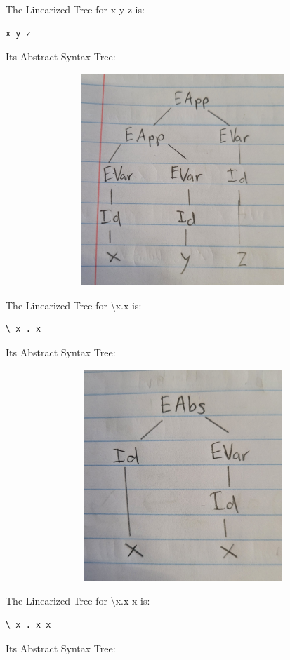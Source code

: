 \documentclass{article}
\theoremstyle{theorem}
\theoremstyle{definition}
\theoremstyle{remark}
\begin{document}
The Linearized Tree for x y z is:
\begin{lstlisting}
x y z
\end{lstlisting}

Its Abstract Syntax Tree:

\includegraphics[width=15cm, height=8cm]{Report Images/week5_4.jpg}

The Linearized Tree for \textbackslash  x.x is:
\begin{lstlisting}
\ x . x
\end{lstlisting}

Its Abstract Syntax Tree:

\includegraphics[width=15cm, height=8cm]{Report Images/week5_5.jpg}

The Linearized Tree for \textbackslash x.x x is:
\begin{lstlisting}
\ x . x x
\end{lstlisting}

Its Abstract Syntax Tree:
\end{document}
